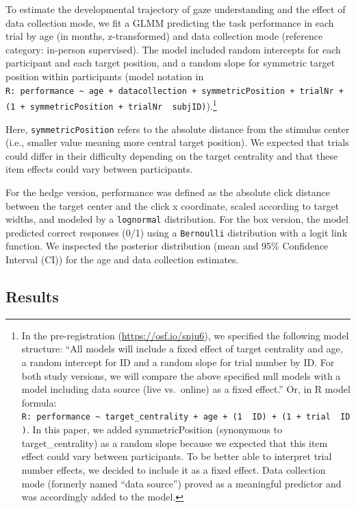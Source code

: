 \documentclass[
  man,floatsintext]{apa7}
\begin{document}
To estimate the developmental trajectory of gaze understanding and the effect of data collection mode, we fit a GLMM predicting the task performance in each trial by age (in months, z-transformed) and data collection mode (reference category: in-person supervised).
The model included random intercepts for each participant and each target position, and a random slope for symmetric target position within participants (model notation in \texttt{R:\ performance\ \textasciitilde{}\ age\ +\ datacollection\ +\ symmetricPosition\ +\ trialNr\ +\ (1\ +\ symmetricPosition\ +\ trialNr\ \textbar{}\ subjID)}).\footnote{In the pre-registration (\url{https://osf.io/snju6}), we specified the following model structure: ``All models will include a fixed effect of target centrality and age, a random intercept for ID and a random slope for trial number by ID. For both study versions, we will compare the above specified null models with a model including data source (live vs.~online) as a fixed effect.'' Or, in R model formula: \texttt{R:\ performance\ \textasciitilde{}\ target\_centrality\ +\ age\ +\ (1\ \textbar{}\ ID)\ +\ (1\ +\ trial\ \textbar{}\ ID)}.
  In this paper, we added symmetricPosition (synonymous to target\_centrality) as a random slope because we expected that this item effect could vary between participants.
  To be better able to interpret trial number effects, we decided to include it as a fixed effect.
  Data collection mode (formerly named ``data source'') proved as a meaningful predictor and was accordingly added to the model.}

Here, \texttt{symmetricPosition} refers to the absolute distance from the stimulus center (i.e., smaller value meaning more central target position).
We expected that trials could differ in their difficulty depending on the target centrality and that these item effects could vary between participants.

For the hedge version, performance was defined as the absolute click distance between the target center and the click x coordinate, scaled according to target widths, and modeled by a \texttt{lognormal} distribution.
For the box version, the model predicted correct responses (0/1) using a \texttt{Bernoulli} distribution with a logit link function.
We inspected the posterior distribution (mean and 95\% Confidence Interval (CI)) for the age and data collection estimates.

\hypertarget{results}{%
\subsection{Results}\label{results}}
\end{document}

